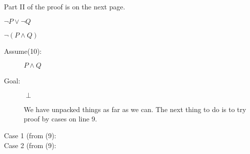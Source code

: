 \documentclass[12pt]{article}
\begin{document}
\begin{description}
\begin{description}
\end{description}

Part II of the proof is on the next page.

\newpage

\item[Part II:]

\begin{description}

\item

\item[Assume(9):]  $\neg P \vee \neg Q$

\item[Goal:]  $\neg(P \wedge Q)$

\begin{description}

\item[Assume(10):] $P \wedge Q$

\item[Goal:]  $\perp$

We have unpacked things as far as we can.  The next thing to do is to try proof
by cases on line 9.

\item[Case 1 (from (9):]  


\item[Case 2 (from (9):]

\end{description}
\end{description}
\end{description}
\end{document}
